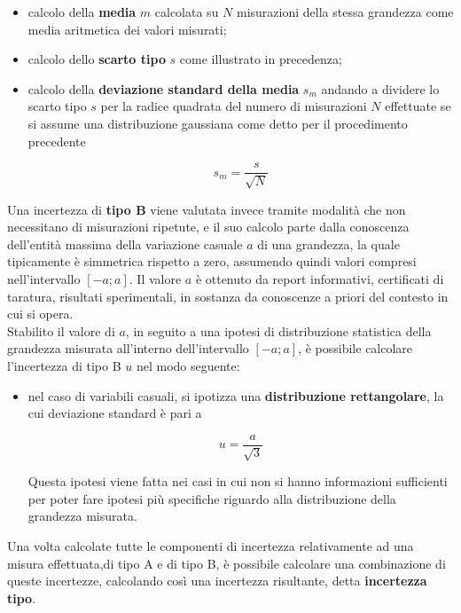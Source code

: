 \documentclass[a4paper, twoside]{article}
\begin{document}
\begin{itemize}
    \item calcolo della \textbf{media} $m$ calcolata su $N$ misurazioni della stessa grandezza come media aritmetica dei valori misurati;
    \item calcolo dello \textbf{scarto tipo} $s$ come illustrato in precedenza;
    \item calcolo della \textbf{deviazione standard della media} $s_m$ andando a dividere lo scarto tipo $s$ per la radice quadrata del numero di misurazioni $N$ effettuate se si assume una distribuzione gaussiana come detto per il procedimento precedente
    
    \begin{equation}
    s_m = \frac{s}{\sqrt{N}}
    \end{equation}

\end{itemize}

Una incertezza di \textbf{tipo B} viene valutata invece tramite modalità che non necessitano di misurazioni ripetute, e il suo calcolo parte dalla conoscenza dell'entità massima della variazione casuale \textbf{$a$} di una grandezza, la quale tipicamente è simmetrica rispetto a zero, assumendo quindi valori compresi nell'intervallo $[-a ; a]$. Il valore \textbf{$a$} è ottenuto da report informativi, certificati di taratura, risultati sperimentali, in sostanza da conoscenze a priori del contesto in cui si opera.\\
Stabilito il valore di $a$, in seguito a una ipotesi di distribuzione statistica della grandezza misurata all'interno dell'intervallo $[-a ; a]$, è possibile calcolare l'incertezza di tipo B $u$ nel modo seguente:

\begin{itemize}
    \item nel caso di variabili casuali, si ipotizza una \textbf{distribuzione rettangolare}, la cui deviazione standard è pari a
    
    \begin{equation}
    u = \frac{a}{\sqrt{3}}
    \end{equation}

     Questa ipotesi viene fatta nei casi in cui non si hanno informazioni sufficienti per poter fare ipotesi più specifiche riguardo alla distribuzione della grandezza misurata.
\end{itemize}

Una volta calcolate tutte le componenti di incertezza relativamente ad una misura effettuata,di tipo A e di tipo B, è possibile calcolare una combinazione di queste incertezze, calcolando così una incertezza risultante, detta \textbf{incertezza tipo}.\par
\end{document}
